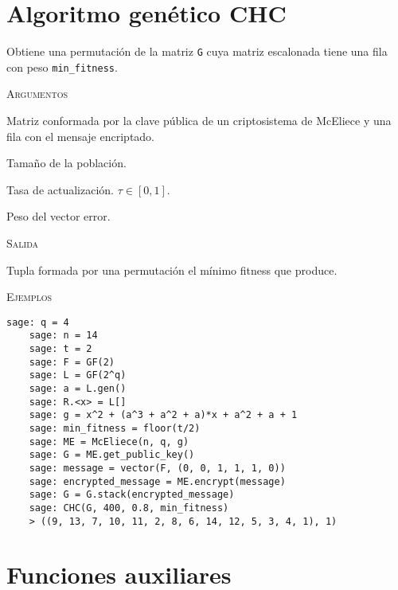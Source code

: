 \section{Algoritmo genético CHC}

\begin{description}[leftmargin=1em, font=\normalfont\ttfamily, style=nextline]
  \item[CHC(G, N, tau, min\_fitness)] Obtiene una permutación de la matriz \texttt{G} cuya matriz escalonada tiene una fila con peso \texttt{min\_fitness}.

  \textsc{Argumentos}
  \begin{description}[font=\normalfont\ttfamily]
    \item[G] Matriz conformada por la clave pública de un criptosistema de McEliece y una fila con el mensaje encriptado.
    \item[N] Tamaño de la población.
    \item[tau] Tasa de actualización. $\tau \in [0,1]$.
    \item[min\_fitness] Peso del vector error. 
  \end{description}

  \textsc{Salida}
  \begin{description}[font=\normalfont\ttfamily]
    \item[] Tupla formada por una permutación el mínimo fitness que produce.
  \end{description}

  \textsc{Ejemplos}
  \begin{lstlisting}[gobble=4]
    sage: q = 4
    sage: n = 14
    sage: t = 2
    sage: F = GF(2)
    sage: L = GF(2^q)
    sage: a = L.gen()
    sage: R.<x> = L[]
    sage: g = x^2 + (a^3 + a^2 + a)*x + a^2 + a + 1
    sage: min_fitness = floor(t/2)
    sage: ME = McEliece(n, q, g)
    sage: G = ME.get_public_key()
    sage: message = vector(F, (0, 0, 1, 1, 1, 0))
    sage: encrypted_message = ME.encrypt(message)
    sage: G = G.stack(encrypted_message)
    sage: CHC(G, 400, 0.8, min_fitness)
    > ((9, 13, 7, 10, 11, 2, 8, 6, 14, 12, 5, 3, 4, 1), 1)
  \end{lstlisting}
\end{description}

\section{Funciones auxiliares}

